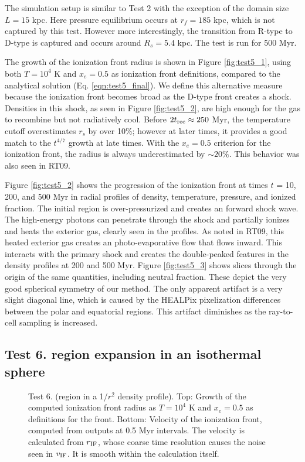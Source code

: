 \documentclass[useAMS,usenatbib,a4paper]{mn2e}
\begin{document}
The simulation setup is similar to Test 2 with the exception of the
domain size $L = 15$ kpc.  Here pressure equilibrium occurs at $r_f =
185$ kpc, which is not captured by this test.  However more
interestingly, the transition from R-type to D-type is captured and
occurs around $R_s = 5.4$ kpc.  The test is run for 500 Myr.

The growth of the ionization front radius is shown in Figure
\ref{fig:test5_1}, using both $T = 10^4$ K and $x_e = 0.5$ as
ionization front definitions, compared to the analytical solution
(Eq. \ref{eqn:test5_final}).  We define this alternative measure
because the ionization front becomes broad as the D-type front creates
a shock.  Densities in this shock, as seen in Figure
\ref{fig:test5_2}, are high enough for the gas to recombine but not
radiatively cool.  Before $2t_{\rm rec} \approx 250$ Myr, the
temperature cutoff overestimates $r_s$ by over 10\%; however at later
times, it provides a good match to the $t^{4/7}$ growth at late times.
With the $x_e = 0.5$ criterion for the ionization front, the radius is
always underestimated by $\sim20\%$.  This behavior was also seen in
RT09.

Figure \ref{fig:test5_2} shows the progression of the ionization front
at times $t$ = 10, 200, and 500 Myr in radial profiles of density,
temperature, pressure, and ionized fraction.  The initial \hii
region is over-pressurized and creates an forward shock wave.  The
high-energy photons can penetrate through the shock and partially
ionizes and heats the exterior gas, clearly seen in the profiles.  As
noted in RT09, this heated exterior gas creates an photo-evaporative
flow that flows inward.  This interacts with the primary shock and
creates the double-peaked features in the density profiles at 200 and
500 Myr.  Figure \ref{fig:test5_3} shows slices through the origin of
the same quantities, including neutral fraction.  These depict the
very good spherical symmetry of our method.  The only apparent
artifact is a very slight diagonal line, which is caused by the
HEALPix pixelization differences between the polar and equatorial
regions.  This artifact diminishes as the ray-to-cell sampling is
increased.

\subsection{Test 6. \hii region expansion in an isothermal
  sphere}

\begin{figure}
  \caption{\label{fig:test6_1} Test 6. (\hii region in a 1/$r^2$
    density profile).  Top: Growth of the computed ionization front
    radius as $T=10^4$ K and $x_e = 0.5$ as definitions for the front.
    Bottom: Velocity of the ionization front, computed from outputs at
    0.5 Myr intervals.  The velocity is calculated from $r_{\rm IF}$,
    whose coarse time resolution causes the noise seen in $v_{\rm
      IF}$.  It is smooth within the calculation itself.}
\end{figure}
\end{document}
